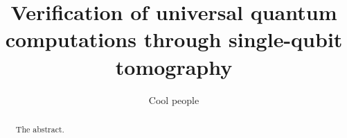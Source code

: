 \documentclass[a4paper,unpublished,onecolumn,11pt]{quantumarticle}
\title{Verification of universal quantum computations through single-qubit tomography}
\author{Cool people}
\begin{document}
\begin{abstract}
    The abstract.
\end{abstract}


\maketitle

\end{document}
